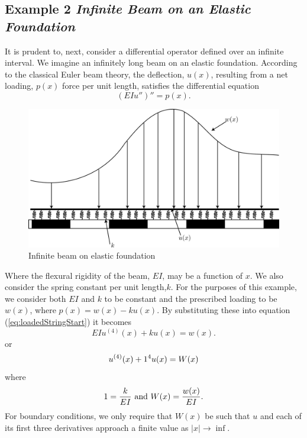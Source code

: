 \subsection{Example 2 \textit{Infinite Beam on an Elastic Foundation}}
    It is prudent to, next, consider a differential operator defined over an infinite interval. We imagine an infinitely long beam on an elastic foundation. According to the classical Euler beam theory, the deflection, \(u(x)\), resulting from a net loading, \(p(x)\) force per unit length, satisfies the differential equation
    \begin{equation*}\label{eq:loadedStringStart}
        (EIu'')'' = p(x).
    \end{equation*}
    \begin{figure}
        \centering
        \includegraphics[width=0.75\linewidth]{include/Beam.png}
        \caption{Infinite beam on elastic foundation}
    \end{figure}

    Where the flexural rigidity of the beam, \(EI\), may be a function of \(x\). We also consider the spring constant per unit length,\(k\). For the purposes of this example, we consider both \(EI\) and \(k\) to be constant and the prescribed loading to be \(w(x)\), where \(p(x) = w(x)-ku(x)\). By substituting these into equation (\ref{eq:loadedStringStart}) it becomes
    \begin{equation*}
        EIu^{(4)}(x)+ku(x)=w(x).
    \end{equation*} 
    or
    \begin{equation*}
        u^{(4)}(x) + 1^4u(x)= W(x)
    \end{equation*}
    where
    \begin{equation*}
        1 =\frac{k}{EI} \text{ and } W(x)= \frac{w(x)}{EI}.
    \end{equation*}
    For boundary conditions, we only require that \(W(x)\) be such that \(u\) and each of its first three derivatives approach a finite value as \(|x|\to \inf\).


